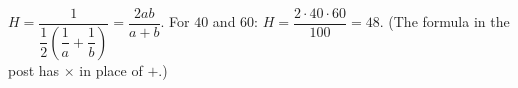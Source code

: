 $H=\dfrac{1}{\dfrac{1}{2}\left(\dfrac{1}{a}+\dfrac{1}{b}\right)}=\dfrac{2ab}{a+b}$. For $40$ and $60$: $H=\dfrac{2\cdot40\cdot60}{100}=\boxed{48}$. (The formula in the post has $\times$ in place of $+$.)
